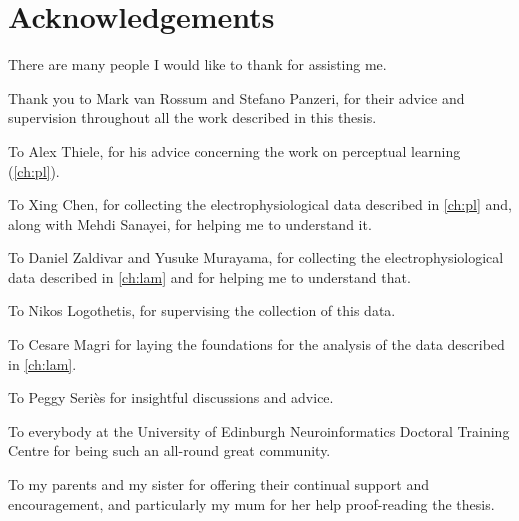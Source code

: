 

\begingroup

\let\clearpage\relax
\let\cleardoublepage\relax
\let\cleardoublepage\relax

\chapter*{Acknowledgements} %

There are many people I would like to thank for assisting me.

Thank you to Mark van Rossum and Stefano Panzeri, for their advice and supervision throughout all the work described in this thesis.

To Alex Thiele, for his advice concerning the work on perceptual learning (\autoref{ch:pl}).

To Xing Chen, for collecting the electrophysiological data described in \autoref{ch:pl} and, along with Mehdi Sanayei, for helping me to understand it.

To Daniel Zaldivar and Yusuke Murayama, for collecting the electrophysiological data described in \autoref{ch:lam} and for helping me to understand that.

To Nikos Logothetis, for supervising the collection of this data.

To Cesare Magri for laying the foundations for the analysis of the data described in \autoref{ch:lam}.

To Peggy Seri{\`e}s for insightful discussions and advice.

To everybody at the University of Edinburgh Neuroinformatics Doctoral Training Centre for being such an all-round great community.

To my parents and my sister for offering their continual support and encouragement, and particularly my mum for her help proof-reading the thesis.

\endgroup
